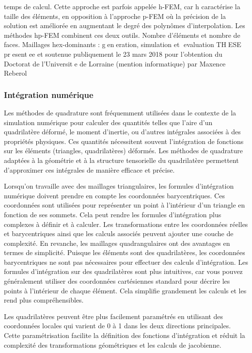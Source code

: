 temps de calcul. Cette approche est parfois appelée h-FEM, car h caractérise la taille des éléments, en opposition à l’approche p-FEM où la précision de la solution est améliorée en augmentant le degré des polynômes d’interpolation. Les méthodes hp-FEM combinent ces deux outils. Nombre d’éléments et nombre de faces.  Maillages hex-dominants : generation, simulation et evaluation THESE presentee et soutenue publiquement le 23 mars 2018 pour l'obtention du Doctorat de l'Universite de Lorraine (mention informatique) par Maxence Reberol

 \subsubsection{Intégration numérique}

 Les méthodes de quadrature sont fréquemment utilisées dans le contexte de la simulation numérique pour calculer des quantités telles que l'aire d'un quadrilatère déformé, le moment d'inertie, ou d'autres intégrales associées à des propriétés physiques. Ces quantités nécessitent souvent l'intégration de fonctions sur les éléments (triangles, quadrilatères) déformés. Les méthodes de quadrature adaptées à la géométrie et à la structure tensorielle du quadrilatère permettent d'approximer ces intégrales de manière efficace et précise.
 
Lorsqu'on travaille avec des maillages triangulaires, les formules d'intégration numérique doivent prendre en compte les coordonnées barycentriques. Ces coordonnées sont utilisées pour représenter un point à l'intérieur d'un triangle en fonction de ses sommets. Cela peut rendre les formules d'intégration plus complexes à définir et à calculer. Les transformations entre les coordonnées réelles et barycentriques ainsi que les calculs associés peuvent ajouter une couche de complexité. En revanche, les maillages quadrangulaires ont des avantages en termes de simplicité. Puisque les éléments sont des quadrilatères, les coordonnées barycentriques ne sont pas nécessaires pour effectuer des calculs d'intégration. Les formules d'intégration sur des quadrilatères sont plus intuitives, car vous pouvez généralement utiliser des coordonnées cartésiennes standard pour décrire les points à l'intérieur de chaque élément. Cela simplifie grandement les calculs et les rend plus compréhensibles.

Les quadrilatères peuvent être plus facilement paramétrés en utilisant des coordonnées locales qui varient de 0 à 1 dans les deux directions principales. Cette paramétrisation facilite la définition des fonctions d'intégration et réduit la complexité des transformations géométriques et les calculs de jacobienne.\\


